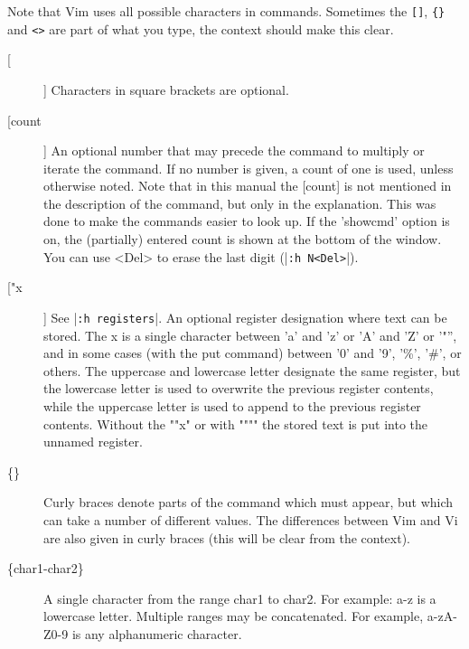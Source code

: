 Note that Vim uses all possible characters in commands.
Sometimes the \verb![]!, \verb!{}! and \verb!<>! are part of what you type, the context should make this clear.

\begin{description}
				\item[[]]
								Characters in square brackets are optional.

				\item[[count]]
								\label{count} \label{[count]}
								An optional number that may precede the command to multiply or iterate the command.
								If no number is given, a count of one is used, unless otherwise noted.
								Note that in this manual the [count] is not mentioned in the description of the command, but only in the explanation.
								This was done to make the commands easier to look up.
								If the 'showcmd' option is on, the (partially) entered count is shown at the bottom of the window.
								You can use <Del> to erase the last digit (|\verb!:h N<Del>!|).

				\item[["x]]
								\label{[quotex]}
								See |\verb!:h registers!|.
								An optional register designation where text can be stored.
								The x is a single character between 'a' and 'z' or 'A' and 'Z' or '"'', and in some cases (with the put command) between '0' and '9', '\%', '\#', or others.
								The uppercase and lowercase letter designate the same register, but the lowercase letter is used to overwrite the previous register contents, while the uppercase letter is used to append to the previous register contents.
								Without the ""x" or with """" the stored text is put into the unnamed register.

				\item[\{\}]
								\label{{}}
								Curly braces denote parts of the command which must appear, but which can take a number of different values.
								The differences between Vim and Vi are also given in curly braces (this will be clear from the context).

				\item[\{char1-char2\}]
								\label{{char1-char2}}
								A single character from the range char1 to char2.
								For example: {a-z} is a lowercase letter.
								Multiple ranges may be concatenated.
								For example, {a-zA-Z0-9} is any alphanumeric character.


\end{description}
